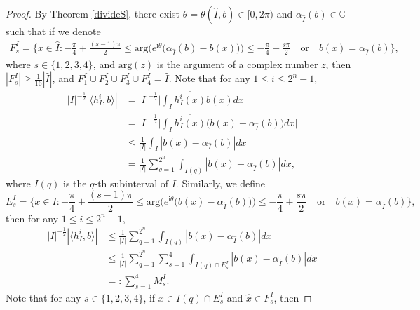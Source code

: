 \documentclass[oneside,english,a4wide]{amsart}
\numberwithin{equation}{section}
\numberwithin{figure}{section}
\theoremstyle{plain}
\theoremstyle{plain}
\theoremstyle{definition}
\theoremstyle{plain}
\theoremstyle{remark}
\theoremstyle{definition}
\theoremstyle{remark}
\theoremstyle{definition}
\newcommand{\8}{\infty}
\begin{document}
\begin{proof}
	By Theorem \ref{divideS}, there exist $\theta={\theta}(\hat{I},b)\in [0,2\pi)$ and $\alpha_{\hat{I}}(b)\in\mathbb{C}$ such that
	if we denote
	\begin{equation*}
		\begin{aligned}
		F_s^I=\bigg\{{x}\in \hat{I}: -\frac{\pi}{4}+\frac{(s-1)\pi}{2}\le \mathrm{arg}\Big(e^{\mathrm{i}\theta}\big(\alpha_{\hat{I}}(b)-b({x})\big)\Big)\le -\frac{\pi}{4}+\frac{s\pi}{2} \quad \text{or}\quad b({x})=\alpha_{
		\hat{I}}(b)\bigg\},
	    \end{aligned}
	\end{equation*}
	where $s\in\{1,2,3,4\}$, and $\mathrm{arg}(z)$ is the argument of a complex number $z$, then $|F_s^I|\ge \frac{1}{16}|\hat{I}|$, and $F_1^I \cup F_2^I \cup F_3^I \cup F_4^I=\hat{I}$.  Note that for any $1\le i\le 2^n-1$,
	\begin{equation*}
		\begin{aligned}
			|I|^{-\frac{1}{2}} |\langle h_I^i,b\rangle|{}
			&=|I|^{-\frac{1}{2}}\bigg|\int_I \overline{h_I^i(x)}b(x)dx\bigg|\\
			&=|I|^{-\frac{1}{2}}\bigg|\int_I \overline{h_I^i(x)}\big(b(x)-\alpha_{\hat{I}}(b)\big)dx\bigg|\\
			&\le \frac{1}{|I|}\int_I |b(x)-\alpha_{\hat{I}}(b)|dx\\
			&=\frac{1}{|I|}\sum_{q=1}^{2^n}\int_{I(q)} |b(x)-\alpha_{\hat{I}}(b)|dx,
		\end{aligned}
	\end{equation*}
    where $I(q)$ is the $q$-th subinterval of $I$.
	Similarly, we define
\begin{equation*}
		E_s^I=\bigg\{x\in I: -\frac{\pi}{4}+\frac{(s-1)\pi}{2}\le \mathrm{arg}\Big(e^{\mathrm{i}{\theta}}\big(b({x})-\alpha_{\hat{I}}(b)\big)\Big)\le -\frac{\pi}{4}+\frac{s\pi}{2} \quad \text{or}\quad b({x})=\alpha_{
			\hat{I}}(b)\bigg\},
	\end{equation*}
	then for any $1\le i\le 2^n-1$,
	\begin{equation}\label{M1M2}
		\begin{aligned}
			|I|^{-\frac{1}{2}} |\langle h_I^i,b\rangle|{}
			&\le\frac{1}{|I|}\sum_{q=1}^{2^n}\int_{I(q)} |b(x)-\alpha_{\hat{I}}(b)|dx\\
			&\le \frac{1}{|I|}\sum_{q=1}^{2^n}\sum_{s=1}^4\int_{I(q)\cap E_s^I} |b(x)-\alpha_{\hat{I}}(b)|dx\\
			&=:\sum_{s=1}^4M_s^I.
		\end{aligned}
	\end{equation}
	Note that for any $s\in \{1,2,3,4\}$, if $x\in I(q)\cap E_s^I$ and $\hat{x}\in F_s^I$, then

\end{proof}
\end{document}
